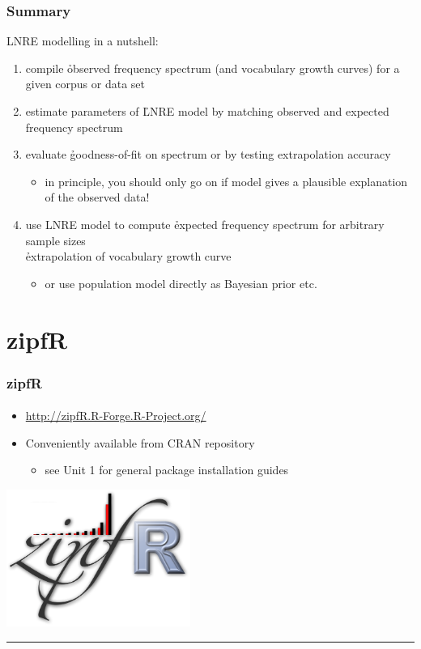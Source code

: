 \documentclass[handout,notes=show,t]{beamer} %
\begin{document}
\begin{frame}
  \frametitle{Summary}

  LNRE modelling in a nutshell:%
  \pause
  \begin{enumerate}
  \item compile \h{observed} frequency spectrum (and vocabulary growth curves)
    for a given corpus or data set%
    \pause
  \item estimate parameters of \h{LNRE model} by matching observed and
    expected frequency spectrum%
    \pause
  \item evaluate \h{goodness-of-fit} on spectrum \citep{Baayen:01} or by
    testing extrapolation accuracy \citep{Baroni:Evert:07a}
    \begin{itemize}
      \item in principle, you should only go on if model gives a plausible
        explanation of the observed data!
    \end{itemize}
    \pause
  \item use LNRE model to compute \h{expected} frequency spectrum for
    arbitrary sample sizes\\
    \so \h{extrapolation} of vocabulary growth curve
    \begin{itemize}
    \item or use population model directly as Bayesian prior etc.
    \end{itemize}
  \end{enumerate}
\end{frame}

\section{zipfR}

\begin{frame}
  \frametitle{zipfR}
  \framesubtitle{\citet{Evert:Baroni:07}}

  \begin{itemize}
  \item \url{http://zipfR.R-Forge.R-Project.org/}
  \item Conveniently available from CRAN repository
    \begin{itemize}
    \item see Unit 1 for general package installation guides
    \end{itemize}
  \end{itemize}

  \begin{flushright}
    \includegraphics[width=6cm]{img/zipfR_logo}
    \rule{1cm}{0mm}
  \end{flushright}

\end{frame}
\end{document}
